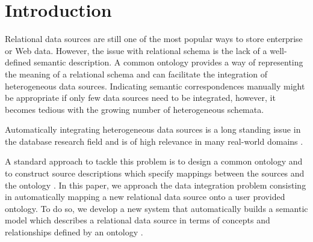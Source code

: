 \documentclass[letterpaper]{article} %
\newcommand{\ignore}[1]{}
\newcommand{\forijcai}[1]{}
\begin{document}
\section{Introduction}
\ignore{
The problem of integrating heterogeneous data sources is a long standing issue 
in the database research field and is of high relevance in many real-world 
domains (see e.g. 
\cite{Rahm:2001:SAA:767149.767154,Dhamankar:imap,Taheriyan2013}).
A common approach to tackle this problem is to design a global model and to
construct source descriptions which specify mappings between the sources and
the global model \cite{doan2012principles}.

In our case, we would like this global model to account not only for structural properties of the original data sources, but also to include the semantics, which is usually implicitly present in the sources.
In other words, we want to build a semantic model which describes the data sources in terms of concepts and relationships defined by an ontology \cite{taheriyan2016learning}.
Henceforth, we focus on a specific data integration problem: automatically mapping a new relational data source onto a user provided ontology.
}
Relational data sources are still one of the most popular ways to store enterprise or Web data. However, the issue with relational schema is the lack of a well-defined semantic description.
A common ontology provides a way of representing the meaning of a relational schema and can facilitate the integration of heterogeneous data sources\forijcai{ within a domain}.
Indicating semantic correspondences manually might be appropriate if only few data sources need to be integrated, however, it becomes tedious with the growing number of heterogeneous schemata.

Automatically integrating heterogeneous data sources is a long standing issue in the database research field and is of high relevance in many real-world 
domains \cite{Rahm:2001:SAA:767149.767154,Dhamankar:imap,Taheriyan2013}.

A standard approach to tackle this problem is to design a common ontology and to construct source descriptions which specify mappings between the sources and the ontology \cite{doan2012principles}.
In this paper, we approach the data integration problem consisting in automatically mapping a new relational data source onto a user provided ontology.
To do so, we develop a new system that automatically builds a semantic model which describes a relational data source in terms of concepts and relationships defined by an ontology \cite{taheriyan2016learning}.
\end{document}

